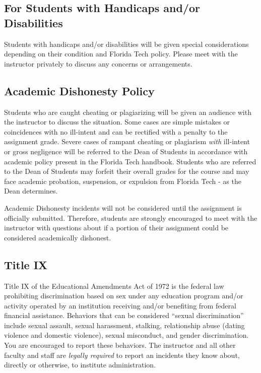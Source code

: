     \subsection*{For Students with Handicaps and/or Disabilities}
    Students with handicaps and/or disabilities will be given special considerations depending on their condition and Florida Tech policy. Please meet with the instructor privately to discuss any concerns or arrangements. 

    \subsection*{Academic Dishonesty Policy}
    Students who are caught cheating or plagiarizing will be given an audience with the instructor to discuss the situation. 
    Some cases are simple mistakes or coincidences with no ill-intent and can be rectified with a penalty to the assignment grade.
    Severe cases of rampant cheating or plagiarism \emph{with} ill-intent or gross negligence will be referred to the Dean of Students in accordance with academic policy present in the Florida Tech handbook.
    Students who are referred to the Dean of Students may forfeit their overall grades for the course and may face academic probation, suspension, or expulsion from Florida Tech - as the Dean determines.
    
    Academic Dishonesty incidents will not be considered until the assignment is officially submitted. 
    Therefore, students are strongly encouraged to meet with the instructor with questions about if a portion of their assignment could be considered academically dishonest.

    \subsection*{Title IX}
    Title IX of the Educational Amendments Act of 1972 is the federal law prohibiting discrimination based on sex under any education program and/or activity operated by an institution receiving and/or benefiting from federal financial assistance. Behaviors that can be considered “sexual discrimination” include sexual assault, sexual harassment, stalking, relationship abuse (dating violence and domestic violence), sexual misconduct, and gender discrimination. You are encouraged to report these behaviors. The instructor and all other faculty and staff are \emph{legally required} to report an incidents they know about, directly or otherwise, to institute administration.

